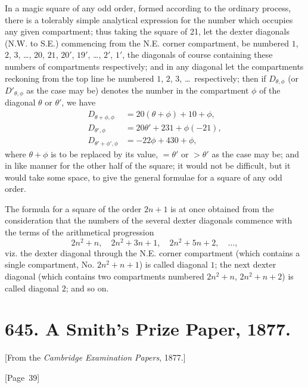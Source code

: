\documentclass[11pt,a4paper]{article}
\theoremstyle{plain}
\theoremstyle{definition}
\theoremstyle{remark}
\begin{document}
In a magic square of any odd order, formed according to the ordinary
process, there is a tolerably simple analytical expression for the number
which occupies any given compartment; thus taking the square of 21, let
the dexter diagonals (N.W. to S.E.) commencing from the N.E. corner
compartment, be numbered $1$, $2$, $3$, \dots, $20$, $21$, $20'$, $19'$,
\dots, $2'$, $1'$, the diagonals of course containing these numbers of
compartments respectively; and in any diagonal let the compartments
reckoning from the top line be numbered $1$, $2$, $3$, \dots\ respectively;
then if $D_{\theta,\phi}$ (or $D'_{\theta,\phi}$ as the case may be) denotes
the number in the compartment $\phi$ of the diagonal $\theta$ or $\theta'$,
we have
\begin{align*}
D_{\theta+\phi,\phi} &= 20(\theta+\phi) + 10 + \phi, \\
D_{\theta',\phi} &= 20\theta' + 231 + \phi(-21), \\
D_{\theta'+\phi',\phi} &= -22\phi + 430 + \phi,
\end{align*}
where $\theta + \phi$ is to be replaced by its value, $= \theta'$ or $> \theta'$ as the
case may be; and in like manner for the other half of the square; it
would not be difficult, but it would take some space, to give the general
formulae for a square of any odd order.

The formula for a square of the order $2n+1$ is at once obtained from
the consideration that the numbers of the several dexter diagonals
commence with the terms of the arithmetical progression
\[
2n^2 + n, \quad 2n^2 + 3n + 1, \quad 2n^2 + 5n + 2, \quad \dots,
\]
viz. the dexter diagonal through the N.E. corner compartment (which
contains a single compartment, No. $2n^2 + n + 1$) is called diagonal $1$;
the next dexter diagonal (which contains two compartments numbered
$2n^2 + n$, $2n^2 + n + 2$) is called diagonal $2$; and so on.


\newpage
\section*{645. A Smith's Prize Paper, 1877.}

[From the \textit{Cambridge Examination Papers}, 1877.]

\begin{center}
[Page~39]
\end{center}
\end{document}
